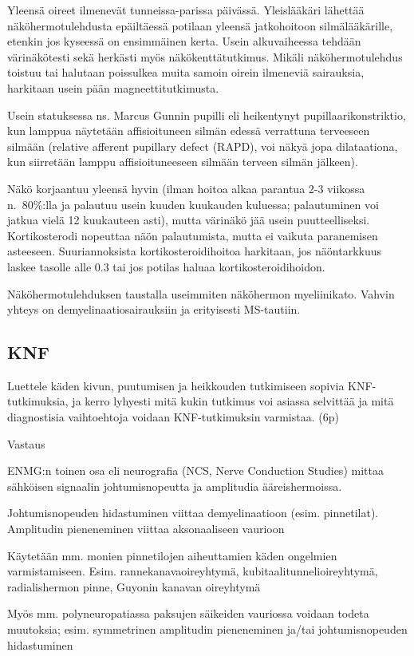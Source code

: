 \documentclass[
]{book}
\begin{document}
Yleensä oireet ilmenevät tunneissa-parissa päivässä. Yleislääkäri lähettää näköhermotulehdusta epäiltäessä potilaan yleensä jatkohoitoon silmälääkärille, etenkin jos kyseessä on ensimmäinen kerta. Usein alkuvaiheessa tehdään värinäkötesti sekä herkästi myös näkökenttätutkimus. Mikäli näköhermotulehdus toistuu tai halutaan poissulkea muita samoin oirein ilmeneviä sairauksia, harkitaan usein pään magneettitutkimusta.

Usein statuksessa ns. Marcus Gunnin pupilli eli heikentynyt pupillaarikonstriktio, kun lamppua näytetään affisioituneen silmän edessä verrattuna terveeseen silmään (relative afferent pupillary defect (RAPD), voi näkyä jopa dilataationa, kun siirretään lamppu affisioituneeseen silmään terveen silmän jälkeen).

Näkö korjaantuu yleensä hyvin (ilman hoitoa alkaa parantua 2-3 viikossa n.~80\%:lla ja palautuu usein kuuden kuukauden kuluessa; palautuminen voi jatkua vielä 12 kuukauteen asti), mutta värinäkö jää usein puutteelliseksi. Kortikosterodi nopeuttaa näön palautumista, mutta ei vaikuta paranemisen asteeseen. Suuriannoksista kortikosteroidihoitoa harkitaan, jos näöntarkkuus laskee tasolle alle 0.3 tai jos potilas haluaa kortikosteroidihoidon.

Näköhermotulehduksen taustalla useimmiten näköhermon myeliinikato. Vahvin yhteys on demyelinaatiosairauksiin ja erityisesti MS-tautiin.

\subsection{KNF}\label{knf}

Luettele käden kivun, puutumisen ja heikkouden tutkimiseen sopivia KNF-tutkimuksia, ja kerro lyhyesti mitä kukin tutkimus voi asiassa selvittää ja mitä diagnostisia vaihtoehtoja voidaan KNF-tutkimuksin varmistaa. (6p)

Vastaus

ENMG:n toinen osa eli neurografia (NCS, Nerve Conduction Studies) mittaa sähköisen signaalin johtumisnopeutta ja amplitudia ääreishermoissa.

Johtumisnopeuden hidastuminen viittaa demyelinaatioon (esim. pinnetilat). Amplitudin pieneneminen viittaa aksonaaliseen vaurioon

Käytetään mm. monien pinnetilojen aiheuttamien käden ongelmien varmistamiseen. Esim. rannekanavaoireyhtymä, kubitaalitunnelioireyhtymä, radialishermon pinne, Guyonin kanavan oireyhtymä

Myös mm. polyneuropatiassa paksujen säikeiden vauriossa voidaan todeta muutoksia; esim. symmetrinen amplitudin pieneneminen ja/tai johtumisnopeuden hidastuminen
\end{document}
